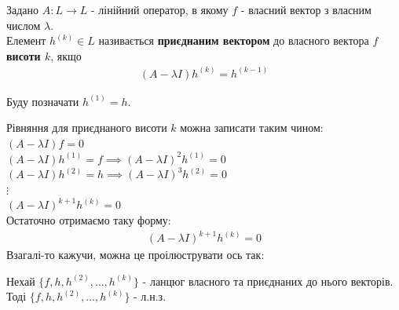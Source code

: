 \begin{definition}
Задано $A: L \to L$ - лінійний оператор, в якому $f$ - власний вектор з власним числом $\lambda$.\\
Елемент $h^{(k)} \in L$ називається \textbf{приєднаним вектором} до власного вектора $f$ \textbf{висоти $k$}, якщо
\begin{align*}
(A-\lambda I)h^{(k)} = h^{(k-1)}
\end{align*}
\end{definition}

\begin{remark}
Буду позначати $h^{(1)} = h$.
\end{remark}

\begin{remark}
Рівняння для приєднаного висоти $k$ можна записати таким чином:\\
$(A-\lambda I)f = 0$\\
$(A-\lambda I)h^{(1)} = f \implies (A-\lambda I)^2 h^{(1)} = 0$\\
$(A-\lambda I)h^{(2)} = h \implies (A-\lambda I)^3 h^{(2)} = 0$\\
$\vdots$\\
$(A-\lambda I)^{k+1}h^{(k)} = 0$\\
Остаточно отримаємо таку форму:
\begin{align*}
(A-\lambda I)^{k+1}h^{(k)} = 0
\end{align*}
Взагалі-то кажучи, можна це проілюструвати ось так:
\begin{figure}[H]
\centering
{}
\end{figure}
\end{remark}

\begin{lemma}
Нехай $\{f,h,h^{(2)},\dots,h^{(k)}\}$ - ланцюг власного та приєднаних до нього векторів.\\
Тоді $\{f,h,h^{(2)},\dots,h^{(k)}\}$ - л.н.з.
\end{lemma}

